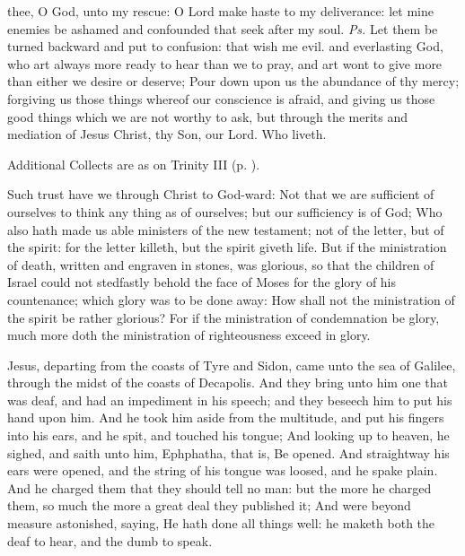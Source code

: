 
\introit
{} thee, O God, unto my rescue: O Lord make haste to my deliverance: let mine enemies be ashamed and confounded that seek after my soul. \textit{Ps.} Let them be turned backward and put to confusion: that wish me evil.
\collect
{} and everlasting God, who art always more ready to hear than we to pray, and art wont to give more than either we desire or deserve; Pour down upon us the abundance of thy mercy; forgiving us those things whereof our conscience is afraid, and giving us those good things which we are not worthy to ask, but through the merits and mediation of Jesus Christ, thy Son, our Lord. Who liveth.
\begin{rubric}
    Additional Collects are as on Trinity III (p. \pageref{TrinityIII}).
\end{rubric}

 Such trust have we through Christ to God-ward: Not that we are sufficient of ourselves to think any thing as of ourselves; but our sufficiency is of God; Who also hath made us able ministers of the new testament; not of the letter, but of the spirit: for the letter killeth, but the spirit giveth life. But if the ministration of death, written and engraven in stones, was glorious, so that the children of Israel could not stedfastly behold the face of Moses for the glory of his countenance; which glory was to be done away: How shall not the ministration of the spirit be rather glorious? For if the ministration of condemnation be glory, much more doth the ministration of righteousness exceed in glory.


 Jesus, departing from the coasts of Tyre and Sidon, came unto the sea of Galilee, through the midst of the coasts of Decapolis. And they bring unto him one that was deaf, and had an impediment in his speech; and they beseech him to put his hand upon him. And he took him aside from the multitude, and put his fingers into his ears, and he spit, and touched his tongue; And looking up to heaven, he sighed, and saith unto him, Ephphatha, that is, Be opened. And straightway his ears were opened, and the string of his tongue was loosed, and he spake plain. And he charged them that they should tell no man: but the more he charged them, so much the more a great deal they published it; And were beyond measure astonished, saying, He hath done all things well: he maketh both the deaf to hear, and the dumb to speak.

